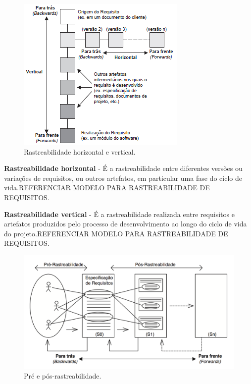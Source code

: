   \begin{figure}[!htbp]
    \centering
    \includegraphics[scale=0.75]{editaveis/figuras/tipos_de_rastreabilidade}
    \caption[Rastreabilidade horizontal e vertical.]{Rastreabilidade horizontal e vertical. \footnotemark}
    \label{ramos_rastreabilidade}
  \end{figure}

\textbf{Rastreabilidade horizontal} - É a rastreabilidade entre diferentes versões ou variações de requisitos, ou outros artefatos, em particular uma fase do ciclo de vida.REFERENCIAR MODELO PARA RASTREABILIDADE DE REQUISITOS.

\textbf{Rastreabilidade vertical} - É a rastreabilidade realizada entre requisitos e artefatos produzidos pelo processo de desenvolvimento ao longo do ciclo de vida do projeto.REFERENCIAR MODELO PARA RASTREABILIDADE DE REQUISITOS.

  \begin{figure}[!htbp]
    \centering
    \includegraphics[scale=0.4]{editaveis/figuras/pre_pos_rastreabilidade}
    \caption[Pré e pós-rastreabilidade.]{Pré e pós-rastreabilidade. \footnotemark}
    \label{pre_pos_rastreabilidade}
  \end{figure}


